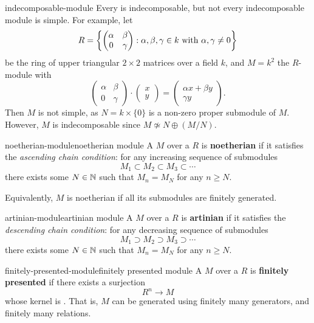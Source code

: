 \begin{example}{indecomposable-module}
    Every  is indecomposable, but not every indecomposable module is simple. For example, let
    \[ R = \left\{ \begin{pmatrix} \alpha & \beta \\ 0 & \gamma \end{pmatrix} : \alpha, \beta, \gamma \in k \textup{ with } \alpha, \gamma \ne 0 \right\} \]
    be the ring of upper triangular $2 \times 2$ matrices over a field $k$, and $M = k^2$ the $R$-module with
    \[ \begin{pmatrix} \alpha & \beta \\ 0 & \gamma \end{pmatrix} \cdot \begin{pmatrix} x \\ y \end{pmatrix} = \begin{pmatrix} \alpha x + \beta y \\ \gamma y \end{pmatrix} . \]
    Then $M$ is not simple, as $N = k \times \{ 0 \}$ is a non-zero proper submodule of $M$. However, $M$ is indecomposable since $M \not\simeq N \oplus (M / N)$.
\end{example}

\begin{topic}{noetherian-module}{noetherian module}
    A  $M$ over a  $R$ is \textbf{noetherian} if it satisfies the \textit{ascending chain condition}: for any increasing sequence of submodules
    \[ M_1 \subset M_2 \subset M_3 \subset \cdots \]
    there exists some $N \in \mathbb{N}$ such that $M_n = M_N$ for any $n \ge N$.
    
    Equivalently, $M$ is noetherian if all its submodules are finitely generated.
\end{topic}

\begin{topic}{artinian-module}{artinian module}
    A  $M$ over a  $R$ is \textbf{artinian} if it satisfies the \textit{descending chain condition}: for any decreasing sequence of submodules
    \[ M_1 \supset M_2 \supset M_3 \supset \cdots \]
    there exists some $N \in \mathbb{N}$ such that $M_n = M_N$ for any $n \ge N$.
\end{topic}

\begin{topic}{finitely-presented-module}{finitely presented module}
    A  $M$ over a  $R$ is \textbf{finitely presented} if there exists a surjection
    \[ R^n \to M \]
    whose kernel is . That is, $M$ can be generated using finitely many generators, and finitely many relations.
\end{topic}

